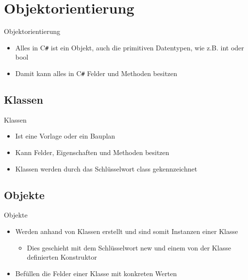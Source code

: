 \section{Objektorientierung}
\begin{frame}{Objektorientierung}
	\begin{itemize}
		\item Alles in C\texttt{\#} ist ein Objekt, auch die primitiven Datentypen, wie z.B. int oder bool
		\item Damit kann alles in C\texttt{\#} Felder und Methoden besitzen		
	\end{itemize}
\end{frame}

\subsection{Klassen}
\begin{frame}{Klassen}
	\begin{itemize}
		\item Ist eine Vorlage oder ein Bauplan
		\item Kann Felder, Eigenschaften und Methoden besitzen
		\item Klassen werden durch das Schlüsselwort \alert{class} gekennzeichnet
	\end{itemize}	
	
\end{frame}

\subsection{Objekte}
\begin{frame}{Objekte}
	\begin{itemize}
		\item Werden anhand von Klassen erstellt und sind somit Instanzen einer Klasse
		\begin{itemize}
			\item Dies geschieht mit dem Schlüsselwort \alert{new} und einem von der Klasse definierten Konstruktor
		\end{itemize}
		\item Befüllen die Felder einer Klasse mit konkreten Werten
	\end{itemize}
		
\end{frame}

